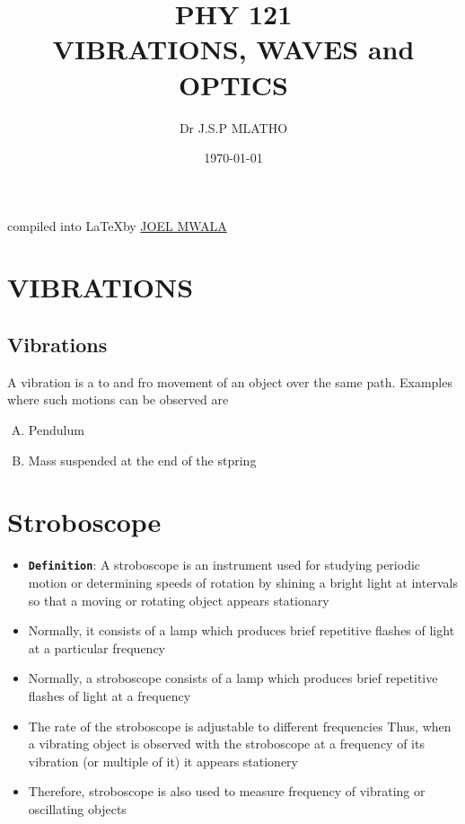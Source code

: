 \documentclass{article}
\title{\textbf{PHY 121 \\[1in] VIBRATIONS, WAVES and OPTICS} }
\date{\today}
\author{Dr J.S.P MLATHO}
\begin{document}
\maketitle
\vspace{4in}
\begin{center}
    compiled into \LaTeX by \href{https://www.joelmwala.tech}{  {JOEL MWALA}}
\end{center}
\newpage

\doublespacing
\tableofcontents
\singlespacing

\newpage



\section{VIBRATIONS}
\subsection{Vibrations}
A vibration is a to and fro movement of an object over the same path. Examples where such motions can be observed are

\begin{enumerate}[(A)]
    \item Pendulum
    \item Mass suspended at the end of the stpring
\end{enumerate}


\newpage






\section{Stroboscope}

\begin{itemize}
    \item \textbf{\texttt{Definition}}: A stroboscope is an instrument used for studying periodic
          motion or determining speeds of rotation by shining a bright light at
          intervals so that a moving or rotating object appears stationary
    \item Normally, it consists of a lamp which produces brief repetitive flashes of light at a particular frequency
    \item Normally, a stroboscope consists of a lamp which produces brief
          repetitive flashes of light at a frequency
    \item The rate of the stroboscope is adjustable to different frequencies
          Thus, when a vibrating object is observed with the stroboscope at a
          frequency of its vibration (or multiple of it) it appears stationery
    \item Therefore, stroboscope is also used to measure frequency of
          vibrating or oscillating objects
\end{itemize}
\end{document}

